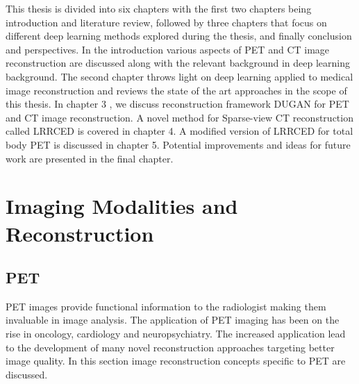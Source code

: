 This thesis is divided into six chapters with the first two chapters being introduction and literature review, followed by three chapters that focus on different deep learning methods explored during the thesis, and finally conclusion and perspectives. In the introduction various aspects of \ac{PET} and \ac{CT} image reconstruction are discussed along with the relevant background in deep learning background. The second chapter throws light on deep learning applied to medical image reconstruction and reviews the state of the art approaches in the scope of this thesis. 
In chapter 3 , we discuss reconstruction framework \ac{DUGAN} for \ac{PET} and \ac{CT} image reconstruction. A novel method for Sparse-view \ac{CT} reconstruction called \ac{LRRCED} is covered in chapter 4. A modified version of \ac{LRRCED} for total body \ac{PET} is discussed in chapter 5. Potential improvements and ideas for future work are presented in the final chapter. 


\section{Imaging Modalities and Reconstruction}


\subsection{PET}


\ac{PET} images provide functional information to the radiologist making them invaluable in image analysis. The application of \ac{PET} imaging has been on the rise in oncology, cardiology and neuropsychiatry. The increased application lead to the development of many novel reconstruction approaches targeting better image quality. In this section image reconstruction concepts specific to \ac{PET} are discussed. 


